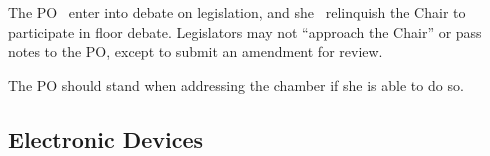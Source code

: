 The PO \mustnot\ enter into debate on legislation, 
and she \maynot\ relinquish the Chair to participate in floor debate. 
Legislators may not ``approach the Chair'' or pass notes to the PO, 
except to submit an amendment for review.

The PO should stand when addressing the chamber if she is able to do so.


\subsection{Electronic Devices}\label{laptops}


























